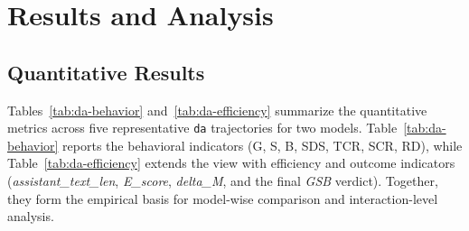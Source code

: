 \documentclass[11pt]{article}
\begin{document}
\section{Results and Analysis}
\subsection{Quantitative Results}
Tables~\ref{tab:da-behavior} and~\ref{tab:da-efficiency} summarize the quantitative metrics across five representative \texttt{da} trajectories for two models.
Table~\ref{tab:da-behavior} reports the behavioral indicators (G, S, B, SDS, TCR, SCR, RD),
while Table~\ref{tab:da-efficiency} extends the view with efficiency and outcome indicators
(\textit{assistant\_text\_len}, \textit{E\_score}, \textit{delta\_M}, and the final \textit{GSB} verdict).
Together, they form the empirical basis for model-wise comparison and interaction-level analysis.

\vspace{6pt}
\end{document}
